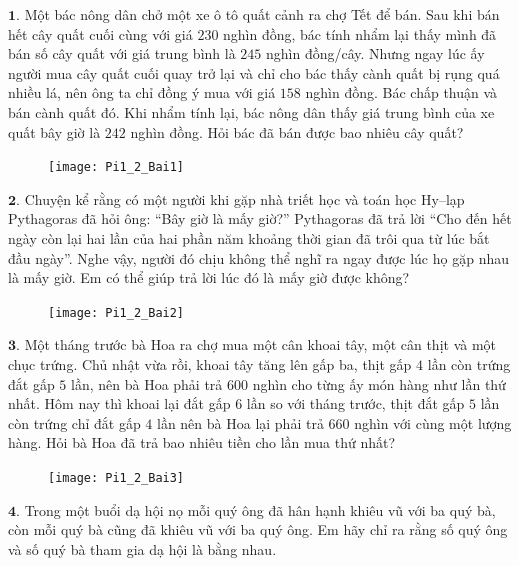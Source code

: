 \begin{multicols}{2}
	$\pmb{1.}$ Một bác nông dân chở một xe ô tô quất cảnh ra chợ Tết để bán. Sau khi bán hết cây quất cuối cùng với giá $230$ nghìn đồng, bác tính nhẩm lại thấy mình đã bán số cây quất với giá trung bình là $245$ nghìn đồng/cây. Nhưng ngay lúc ấy người mua cây quất cuối quay trở lại và chỉ cho bác thấy cành quất bị rụng quá nhiều lá, nên ông ta chỉ đồng ý mua với giá $158$ nghìn đồng. Bác chấp thuận và bán cành quất đó. Khi nhẩm tính lại, bác nông dân thấy giá trung bình của xe quất bây giờ là $242$ nghìn đồng. Hỏi bác đã bán được bao nhiêu cây quất?
	\begin{figure}[H]
		\centering
		\vspace*{-10pt}
		\captionsetup{labelformat= empty, justification=centering}
		\texttt{[image: Pi1\_2\_Bai1]}
		\vspace*{-10pt}
	\end{figure}
	$\pmb{2.}$ Chuyện kể rằng có một người khi gặp nhà triết học và toán học Hy--lạp Pythagoras đã hỏi ông: “Bây giờ là mấy giờ?” Pythagoras đã trả lời “Cho đến hết ngày còn lại hai lần của hai phần năm khoảng thời gian đã trôi qua từ lúc bắt đầu ngày”. Nghe vậy, người đó chịu không thể nghĩ ra ngay được lúc họ gặp nhau là mấy giờ. Em có thể giúp trả lời lúc đó là mấy giờ được không?
	\begin{figure}[H]
		\centering
		\vspace*{-10pt}
		\captionsetup{labelformat= empty, justification=centering}
		\texttt{[image: Pi1\_2\_Bai2]}
		\vspace*{-5pt}
	\end{figure}
	$\pmb{3.}$ Một tháng trước bà Hoa ra chợ mua một cân khoai tây, một cân thịt và một chục trứng. Chủ nhật vừa rồi, khoai tây tăng lên gấp ba, thịt gấp $4$ lần còn trứng đắt gấp $5$ lần, nên bà Hoa phải trả $600$ nghìn cho từng ấy món hàng như lần thứ nhất. Hôm nay thì khoai lại đắt gấp $6$ lần so với tháng trước, thịt đắt gấp $5$ lần còn trứng chỉ đắt gấp $4$ lần nên bà Hoa lại phải trả $660$ nghìn với cùng một lượng hàng. Hỏi bà Hoa đã trả bao nhiêu tiền cho lần mua thứ nhất?
	\begin{figure}[H]
		\centering
		\vspace*{-10pt}
		\captionsetup{labelformat= empty, justification=centering}
		\texttt{[image: Pi1\_2\_Bai3]}
		\vspace*{-10pt}
	\end{figure}
	$\pmb{4.}$ Trong một buổi dạ hội nọ mỗi quý ông đã hân hạnh khiêu vũ với ba quý bà, còn mỗi quý bà cũng đã khiêu vũ với ba quý ông. Em hãy chỉ ra rằng số quý ông và số quý bà tham gia dạ hội là bằng nhau.

\end{multicols}
